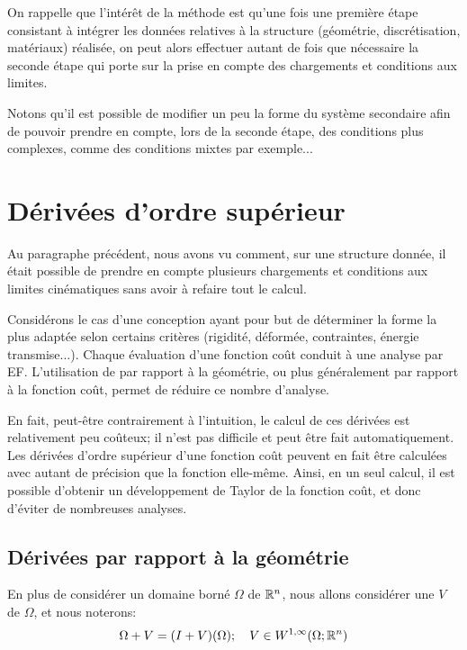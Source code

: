 \bigskip
{}

\medskip
On rappelle que l'intérêt de la méthode est qu'une fois une première étape consistant
à intégrer les données relatives à la structure (géométrie, discrétisation, matériaux)
réalisée, on peut alors effectuer autant de fois que nécessaire la seconde étape qui porte
sur la prise en compte des chargements et conditions aux limites.

Notons qu'il est possible de modifier un peu la forme du système secondaire afin de pouvoir prendre
en compte, lors de la seconde étape, des conditions plus complexes, comme des conditions mixtes
par exemple...


\medskip
\section{Dérivées d'ordre supérieur}\label{Sec-Deriv}
Au paragraphe précédent, nous avons vu comment, sur une structure donnée, il était
possible de prendre en compte plusieurs chargements et conditions aux limites cinématiques
sans avoir à refaire tout le calcul.


\medskip
Considérons le cas d'une conception ayant pour but de déterminer la forme la plus
adaptée selon certains critères (rigidité, déformée, contraintes, énergie
transmise...).
Chaque évaluation d'une fonction coût conduit à une analyse par EF.
L'utilisation de  par rapport à la géométrie, ou plus
généralement par rapport à la fonction coût, permet de réduire ce nombre
d'analyse.

En fait, peut-être contrairement à l'intuition, le calcul de ces dérivées est relativement
peu coûteux; il n'est pas difficile et peut être fait automatiquement. Les dérivées
d'ordre supérieur d'une fonction coût peuvent en fait
être calculées avec autant de précision que la fonction elle-même. Ainsi, en un seul calcul,
il est possible d'obtenir un développement de Taylor de la fonction coût, et donc d'éviter de
nombreuses analyses.

\medskip
\subsection{Dérivées par rapport à la géométrie}
En plus de considérer un domaine borné $\Omega$ de $\mathbb R^n$, nous allons considérer
une  $V$ de $\Omega$, et nous noterons:
\begin{equation} \Omega + V = (I+V)(\Omega);\quad V\in W^{1,\infty}(\Omega;\mathbb R^n) \end{equation}

